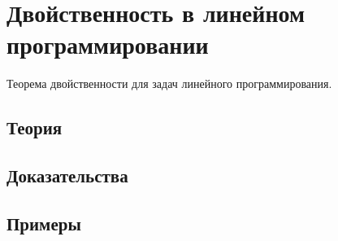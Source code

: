 
\section{Двойственность в линейном программировании}
\label{sec:2.4.08-lp-duality}

\begin{ticket}
Теорема двойственности для задач линейного программирования.
\end{ticket}

\subsection*{Теория}

\subsection*{Доказательства}

\subsection*{Примеры}

